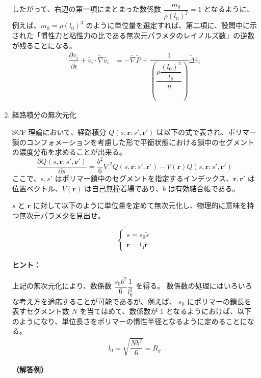 \documentclass[uplatex,dvipdfmx,a4paper,11pt]{jsarticle}
\newcommand{\difp}[2]{\dfrac{\partial #1}{\partial #2}}
\begin{document}
\begin{enumerate}
したがって、右辺の第一項にまとまった数係数 $\dfrac{m_0}{\rho (l_0)^3} = 1$ となるように、例えば、$m_0  = \rho (l_0)^3$ のように単位量を選定すれば、第二項に、設問中に示された「慣性力と粘性力の比である無次元パラメタのレイノルズ数」の逆数が残ることになる。
\begin{align*}
\difp{\tilde{v}_i}{\tilde{t}} + \tilde{v_i} \cdot \tilde{\nabla} \tilde{v_i} &= - \tilde{\nabla} \tilde{P} + \dfrac{1}{\left( \dfrac{\rho \dfrac{(l_0)^2}{t_0}}{\eta} \right)} \tilde{\Delta} \tilde{v_i}
\end{align*}

\newpage

\item 経路積分の無次元化 

SCF 理論において、経路積分 $Q(s, \bm{r}: s', \bm{r'})$ は以下の式で表され、ポリマー鎖のコンフォメーションを考慮した形で平衡状態における鎖中のセグメントの濃度分布を求めることが出来る。 
\begin{equation*}
\difp{Q(s, \bm{r}: s', \bm{r'})}{s} = \dfrac{b^2}{6} \nabla^2 Q(s, \bm{r}: s', \bm{r'}) - V(\bm{r}) Q(s, \bm{r}: s', \bm{r'})
\end{equation*}
ここで、$s, s'$ はポリマー鎖中のセグメントを指定するインデックス、$\bm{r}, \bm{r'}$ は位置ベクトル、$V(\bm{r})$ は自己無撞着場であり、$b$ は有効結合帳である。

$s$ と $\bm{r}$ に対して以下のように単位量を定めて無次元化し、物理的に意味を持つ無次元パラメタを見出せ。

\begin{align*}
\begin{cases}
s= s_0 \tilde{s} \\
\bm{r} = l_0 \tilde{\bm{r}}
\end{cases}
\end{align*}

\begin{itembox}[l]{{\bf ヒント：}}

上記の無次元化により、数係数 $\dfrac{s_0 b^2}{6} \dfrac{1}{l_0^2} $ を得る。
数係数の処理にはいろいろな考え方を適応することが可能であるが、例えば、
$s_0$ にポリマーの鎖長を表すセグメント数 $N$ を当てはめて、数係数が 1 となるようにおけば、以下のようになり、単位長さをポリマーの慣性半径となるように定めることになる。
\begin{align*}
l_0 = \sqrt{\dfrac{N b^2}{6}} = R_g
\end{align*}

\end{itembox}

\vspace{10pt}
{\bf （解答例）}


\end{enumerate}
\end{document}
